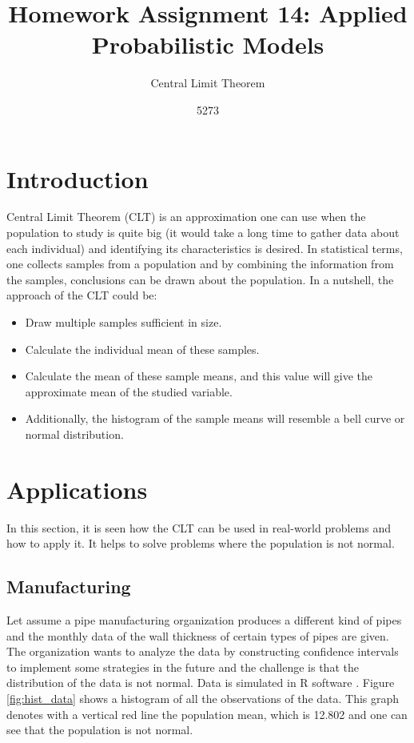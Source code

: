 \documentclass[10pt,leter,openany]{article}
\author{5273}
\title{Homework Assignment 14: Applied Probabilistic Models}
\subtitle{Central Limit Theorem}
\date{}
\begin{document}
	
\maketitle

\section{Introduction}

	Central Limit Theorem (CLT) is an approximation one can use when the population to study is quite big (it would take a long time to gather data about each individual) and identifying its characteristics is desired. In statistical terms, one collects samples from a population and by combining the information from the samples, conclusions can be drawn about the population. In a nutshell, the approach of the CLT could be:
\begin{itemize}
	\item Draw multiple samples sufficient in size.
	\item Calculate the individual mean of these samples.
	\item Calculate the mean of these sample means, and this value will give the approximate mean of the studied variable.
	\item Additionally, the histogram of the sample means will resemble a bell curve or normal distribution.
\end{itemize}

\section{Applications}

	In this section, it is seen how the CLT can be used in real-world problems and how to apply it. It helps to solve problems where the population is not normal.
	
	\subsection{Manufacturing}

		Let assume a pipe manufacturing organization produces a different kind of pipes and the monthly data of the wall thickness of certain types of pipes are given. The organization wants to analyze the data by constructing confidence intervals to implement some strategies in the future and the challenge is that the distribution of the data is not normal. Data is simulated in R software \citep{r}. Figure \ref{fig:hist_data} shows a histogram of all the observations of the data. This graph denotes with a vertical red line the population mean, which is 12.802 and one can see that the population is not normal.
		
\end{document}
